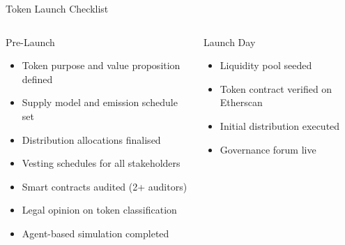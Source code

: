 \documentclass[8pt,aspectratio=169]{beamer}
\begin{document}
\begin{frame}{Token Launch Checklist}
\begin{columns}[T]
\begin{block}{Pre-Launch}
\footnotesize
\begin{itemize}
  \item[\checkmark] Token purpose and value proposition defined
  \item[\checkmark] Supply model and emission schedule set
  \item[\checkmark] Distribution allocations finalised
  \item[\checkmark] Vesting schedules for all stakeholders
  \item[\checkmark] Smart contracts audited (2+ auditors)
  \item[\checkmark] Legal opinion on token classification
  \item[\checkmark] Agent-based simulation completed
\end{itemize}
\end{block}
\vspace{1mm}
\begin{block}{Launch Day}
\footnotesize
\begin{itemize}
  \item[\checkmark] Liquidity pool seeded
  \item[\checkmark] Token contract verified on Etherscan
  \item[\checkmark] Initial distribution executed
  \item[\checkmark] Governance forum live
\end{itemize}
\end{block}


\end{columns}
\end{frame}
\end{document}
